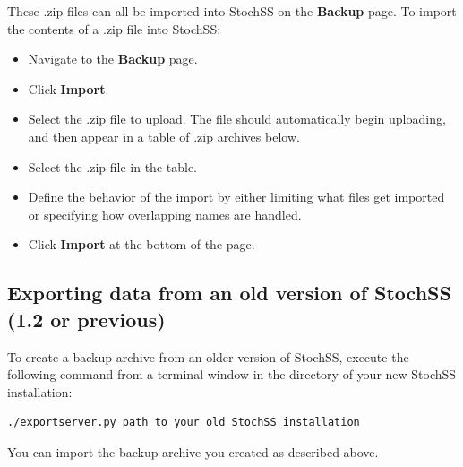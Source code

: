 These .zip files can all be imported into StochSS on the \textbf{Backup} page. To import the contents of a .zip file into StochSS:

\begin{itemize}
\item Navigate to the \textbf{Backup} page.
\item Click \textbf{Import}.
\item Select the .zip file to upload. The file should automatically begin uploading, and then appear in a table of .zip archives below.
\item Select the .zip file in the table.
\item Define the behavior of the import by either limiting what files get imported or specifying how overlapping names are handled.
\item Click \textbf{Import} at the bottom of the page.
\end{itemize}

\subsection{Exporting data from an old version of StochSS (1.2 or previous)}
To create a backup archive from an older version of StochSS, execute the following command from a terminal window in the directory of your new StochSS installation:
\begin{verbatim}
./exportserver.py path_to_your_old_StochSS_installation
\end{verbatim}
You can import the backup archive you created as described above.

